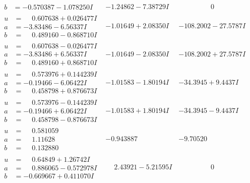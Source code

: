 \documentclass[1p]{elsarticle_modified}
\theoremstyle{definition}
\begin{document}
$$\begin{array}{c|c|c}
\begin{aligned}
b &= -0.570387 - 1.078250 I\end{aligned}
 & -1.24862 - 7.38729 I & \phantom{-0.000000 } 0 \\ \hline\begin{aligned}
u &= \phantom{-}0.607638 + 0.026477 I \\
a &= -3.83486 - 6.56337 I \\
b &= \phantom{-}0.489160 - 0.868710 I\end{aligned}
 & -1.01649 + 2.08350 I & -108.2002 - 27.5787 I \\ \hline\begin{aligned}
u &= \phantom{-}0.607638 - 0.026477 I \\
a &= -3.83486 + 6.56337 I \\
b &= \phantom{-}0.489160 + 0.868710 I\end{aligned}
 & -1.01649 - 2.08350 I & -108.2002 + 27.5787 I \\ \hline\begin{aligned}
u &= \phantom{-}0.573976 + 0.144239 I \\
a &= -0.19466 - 6.06422 I \\
b &= \phantom{-}0.458798 + 0.876673 I\end{aligned}
 & -1.01583 - 1.80194 I & -34.3945 + 9.4437 I \\ \hline\begin{aligned}
u &= \phantom{-}0.573976 - 0.144239 I \\
a &= -0.19466 + 6.06422 I \\
b &= \phantom{-}0.458798 - 0.876673 I\end{aligned}
 & -1.01583 + 1.80194 I & -34.3945 - 9.4437 I \\ \hline\begin{aligned}
u &= \phantom{-}0.581059\phantom{ +0.000000I} \\
a &= \phantom{-}1.11628\phantom{ +0.000000I} \\
b &= \phantom{-}0.132880\phantom{ +0.000000I}\end{aligned}
 & -0.943887\phantom{ +0.000000I} & -9.70520\phantom{ +0.000000I} \\ \hline\begin{aligned}
u &= \phantom{-}0.64849 + 1.26742 I \\
a &= \phantom{-}0.886065 - 0.572978 I \\
b &= -0.669667 + 0.411070 I\end{aligned}
 & \phantom{-}2.43921 - 5.21595 I & \phantom{-0.000000 } 0 \\ \hline\begin{aligned}

\end{aligned}
\end{array}$$
\end{document}
